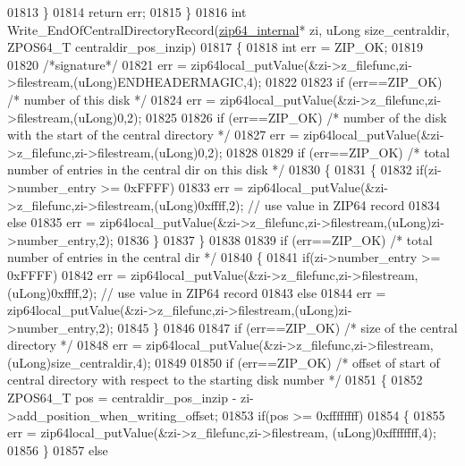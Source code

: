 \begin{DoxyCode}
01813   \}
01814   \textcolor{keywordflow}{return} err;
01815 \}
01816 \textcolor{keywordtype}{int} Write\_EndOfCentralDirectoryRecord(\hyperlink{structzip64__internal}{zip64\_internal}* zi, uLong size\_centraldir, ZPOS64\_T 
      centraldir\_pos\_inzip)
01817 \{
01818   \textcolor{keywordtype}{int} err = ZIP\_OK;
01819 
01820   \textcolor{comment}{/*signature*/}
01821   err = zip64local\_putValue(&zi->z\_filefunc,zi->filestream,(uLong)ENDHEADERMAGIC,4);
01822 
01823   \textcolor{keywordflow}{if} (err==ZIP\_OK) \textcolor{comment}{/* number of this disk */}
01824     err = zip64local\_putValue(&zi->z\_filefunc,zi->filestream,(uLong)0,2);
01825 
01826   \textcolor{keywordflow}{if} (err==ZIP\_OK) \textcolor{comment}{/* number of the disk with the start of the central directory */}
01827     err = zip64local\_putValue(&zi->z\_filefunc,zi->filestream,(uLong)0,2);
01828 
01829   \textcolor{keywordflow}{if} (err==ZIP\_OK) \textcolor{comment}{/* total number of entries in the central dir on this disk */}
01830   \{
01831     \{
01832       \textcolor{keywordflow}{if}(zi->number\_entry >= 0xFFFF)
01833         err = zip64local\_putValue(&zi->z\_filefunc,zi->filestream,(uLong)0xffff,2); \textcolor{comment}{// use value in ZIP64
       record}
01834       \textcolor{keywordflow}{else}
01835         err = zip64local\_putValue(&zi->z\_filefunc,zi->filestream,(uLong)zi->number\_entry,2);
01836     \}
01837   \}
01838 
01839   \textcolor{keywordflow}{if} (err==ZIP\_OK) \textcolor{comment}{/* total number of entries in the central dir */}
01840   \{
01841     \textcolor{keywordflow}{if}(zi->number\_entry >= 0xFFFF)
01842       err = zip64local\_putValue(&zi->z\_filefunc,zi->filestream,(uLong)0xffff,2); \textcolor{comment}{// use value in ZIP64
       record}
01843     \textcolor{keywordflow}{else}
01844       err = zip64local\_putValue(&zi->z\_filefunc,zi->filestream,(uLong)zi->number\_entry,2);
01845   \}
01846 
01847   \textcolor{keywordflow}{if} (err==ZIP\_OK) \textcolor{comment}{/* size of the central directory */}
01848     err = zip64local\_putValue(&zi->z\_filefunc,zi->filestream,(uLong)size\_centraldir,4);
01849 
01850   \textcolor{keywordflow}{if} (err==ZIP\_OK) \textcolor{comment}{/* offset of start of central directory with respect to the starting disk number */}
01851   \{
01852     ZPOS64\_T pos = centraldir\_pos\_inzip - zi->add\_position\_when\_writing\_offset;
01853     \textcolor{keywordflow}{if}(pos >= 0xffffffff)
01854     \{
01855       err = zip64local\_putValue(&zi->z\_filefunc,zi->filestream, (uLong)0xffffffff,4);
01856     \}
01857     \textcolor{keywordflow}{else}

\end{DoxyCode}
